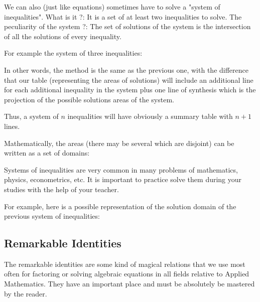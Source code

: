 	We can also (just like equations) sometimes have to solve a "system of inequalities". What is it ?: It is a set of at least two inequalities to solve. The peculiarity of the system ?: The set of solutions of the system is the intersection of all the solutions of every inequality.
	
	For example the system of three inequalities:
	
	In other words, the method is the same as the previous one, with the difference that our table (representing the areas of solutions) will include an additional line for each additional inequality in the system plus one line of synthesis which is the projection of the possible solutions areas of the system.
	
	Thus, a system of $n$ inequalities will have obviously a summary table with $n+1$ lines.
	
	Mathematically, the areas (there may be several which are disjoint) can be written as a set of domains:
	
	Systems of inequalities are very common in many problems of mathematics, physics, econometrics, etc. It is important to practice solve them during your studies with the help of your teacher.
	
	For example, here is a possible representation of the solution domain of the previous system of inequalities:
	\begin{center}
	\end{center}
	
	\subsection{Remarkable Identities}\label{calculus remarkable identities}
	The remarkable identities are some kind of magical relations that we use most often for factoring or solving algebraic equations in all fields relative to Applied Mathematics. They have an important place and must be absolutely be mastered by the reader.
	

